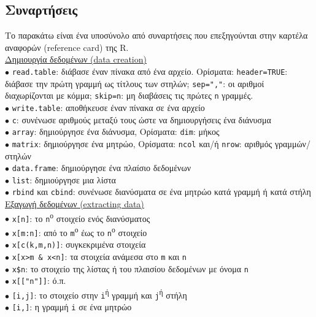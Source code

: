 \documentclass[a4paper,10pt,twocolumn]{article}
\begin{document}
\subsection{Συναρτήσεις}

Το παρακάτω είναι ένα υποσύνολο από συναρτήσεις που επεξηγούνται στην καρτέλα αναφορών (reference card) της R.\\

\noindent \underline{Δημιουργία δεδομένων (data creation)}\\
$\bullet$ \texttt{read.table}: διάβασε έναν πίνακα από ένα αρχείο. Ορίσματα: \texttt{header=TRUE}: διάβασε
την πρώτη γραμμή ως τίτλους των στηλών; \texttt{sep=","}: οι αριθμοί διαχωρίζονται με κόμμα; \texttt{skip=n}:
μη διαβάσεις τις πρώτες \texttt{n} γραμμές.\\
$\bullet$ \texttt{write.table}: αποθήκευσε έναν πίνακα σε ένα αρχείο\\
$\bullet$ \texttt{c}: συνένωσε αριθμούς μεταξύ τους ώστε να δημιουργήσεις ένα διάνυσμα\\
$\bullet$ \texttt{array}: δημιούργησε ένα διάνυσμα, Ορίσματα: \texttt{dim}: μήκος\\
$\bullet$ \texttt{matrix}: δημιούργησε ένα μητρώο, Ορίσματα: \texttt{ncol} και/ή \texttt{nrow}: αριθμός γραμμών/
στηλών\\
$\bullet$ \texttt{data.frame}: δημιούργησε ένα πλαίσιο δεδομένων\\
$\bullet$ \texttt{list}: δημιούργησε μια λίστα\\
$\bullet$ \texttt{rbind} και \texttt{cbind}: συνένωσε διανύσματα σε ένα μητρώο κατά γραμμή ή κατά στήλη\\

\noindent \underline{Εξαγωγή δεδομένων (extracting data)}\\
$\bullet$ \texttt{x[n]}: το \texttt{n}\textsuperscript{ο} στοιχείο ενός διανύσματος\\
$\bullet$ \texttt{x[m:n]}: από το \texttt{m}\textsuperscript{ο} έως το \texttt{n}\textsuperscript{ο} στοιχείο\\
$\bullet$ \texttt{x[c(k,m,n)]}: συγκεκριμένα στοιχεία\\
$\bullet$ \texttt{x[x>m \& x<n]}: τα στοιχεία ανάμεσα στο \texttt{m} και \texttt{n}\\
$\bullet$ \verb!x$n!:  το στοιχείο της λίστας ή του πλαισίου δεδομένων με όνομα \texttt{n}\\  %
$\bullet$ \texttt{x[["n"]]}: ό.π.\\
$\bullet$ \texttt{[i,j]}: το στοιχείο στην \texttt{i}\textsuperscript{ή} γραμμή και
\texttt{j}\textsuperscript{ή} στήλη \\
$\bullet$ \texttt{[i,]}: η γραμμή \texttt{i} σε ένα μητρώο\\
\end{document}
